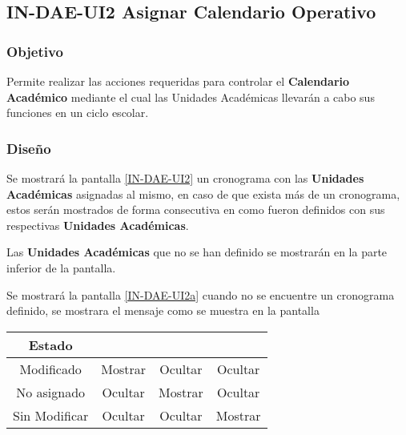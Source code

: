 \subsection{IN-DAE-UI2 Asignar Calendario Operativo }

\subsubsection{Objetivo}

Permite realizar las acciones requeridas para controlar el \textbf{Calendario Académico} mediante el cual las Unidades Académicas llevarán a cabo sus funciones en un ciclo escolar.

\subsubsection{Diseño}

Se mostrará la pantalla \ref{IN-DAE-UI2} un cronograma con las \textbf{Unidades Académicas} asignadas al mismo, en caso de que exista más de un cronograma, estos serán mostrados de forma consecutiva en como fueron definidos con sus respectivas \textbf{Unidades Académicas}.

Las \textbf{Unidades Académicas} que no se han definido se mostrarán en la parte inferior de la pantalla. 

Se mostrará la pantalla \ref{IN-DAE-UI2a} cuando no se encuentre un cronograma definido, se mostrara el mensaje  como se muestra en la pantalla 


\label{TablaComportamiento-IN-DAE-UI2}
\begin{table}[htbp]
	\begin{center}
		\begin{tabular}{|c|c|c|c|}
			\hline
			Estado & \IUDone & \IURechazar & \IUVer \\
			\hline \hline
			Modificado & Mostrar & Ocultar & Ocultar  \\ \hline
			No asignado & Ocultar & Mostrar & Ocultar  \\ \hline
			Sin Modificar & Ocultar & Ocultar & Mostrar  \\ \hline
			
		\end{tabular}
	\end{center}
\end{table}

